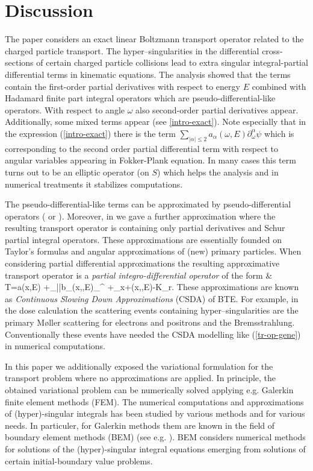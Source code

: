\documentclass[a4paper,12pt,oneside,reqno]{amsart}
\def\bea#1\eea{\begin{align}#1\end{align}}
\newcommand{\p}[2]{\frac{\partial #1}{\partial #2}}
\def\bea#1\eea{\begin{align}#1\end{align}}
\theoremstyle{theorem}
\begin{document}
\section{Discussion}\label{discus}

The  paper considers an exact  linear Boltzmann transport operator related to the charged particle transport.
The hyper--singularities in the differential cross-sections of certain charged particle collisions lead to extra singular integral-partial differential terms in kinematic equations. 
The analysis showed that the terms contain the first-order partial derivatives with respect to energy $E$ combined with Hadamard finite part integral operators which are pseudo-differential-like operators. With respect to angle
$\omega$ also second-order partial derivatives appear. Additionally, some mixed terms appear (see \ref{intro-exact}).
Note especially that in the expression (\ref{intro-exact})  there is the term $\sum_{|\alpha|\leq 2}a_\alpha(\omega,E)\partial_\omega^\alpha\psi$ which is corresponding to the second order partial differential term with respect to angular variables appearing in Fokker-Plank equation. In many cases this term turns out to be an elliptic operator (on $S$) which helps the analysis and in numerical treatments it stabilizes computations.



The pseudo-differential-like terms can be  approximated by pseudo-differential operators (\cite{tervo18} or \cite{tervo18-up}).
Moreover, in \cite{tervo18-up} we gave a further approximation  where the resulting transport operator is containing only partial derivatives and Schur partial integral operators. These 
approximations are essentially founded on Taylor's formulas
and  angular approximations of (new) primary particles.
When considering partial differential approximations the resulting approximative transport operator is a \emph{partial integro-differential operator} of the form
\bea\label{tr-op-gene}
&
T\psi=a(x,E){\p {\psi}E}
+\sum_{|\alpha|}b_\alpha(x,\omega,E)\partial_\omega^\alpha\psi
+\omega\cdot\nabla_x\psi+\Sigma(x,\omega,E)\psi-K_r\psi.
\eea
These approximations are known as \emph{Continuous Slowing Down Approximations} (CSDA) of BTE.
For example, 
in the dose calculation  the scattering events containing hyper--singularities  are the primary M\o ller scattering for electrons and positrons and the Bremsstrahlung. Conventionally these events have needed  the CSDA modelling like (\ref{tr-op-gene}) in numerical computations.

In this paper we additionally exposed the variational formulation for the  transport problem where no approximations are applied. In principle, the obtained variational problem can be numerically solved applying e.g. Galerkin finite element methods (FEM). The numerical computations and approximations of (hyper)-singular integrals has been studied by various methods and for various needs. In particuler, for Galerkin methods them are known in   the field of boundary element methods (BEM) (see e.g. \cite{carley}). BEM considers numerical methods for solutions of the (hyper)-singular integral equations emerging from  solutions of certain initial-boundary value problems.
\end{document}

